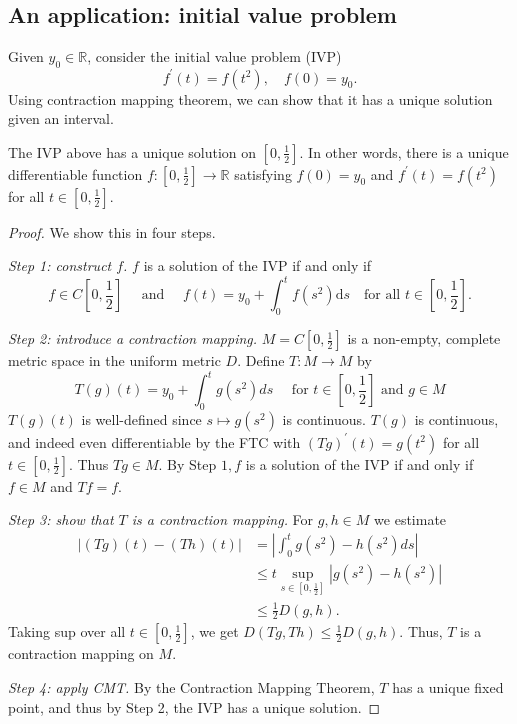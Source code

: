 \documentclass[a4paper,11pt]{article}
\begin{document}
\subsection{An application: initial value problem}
Given $y_0 \in \mathbb{R}$, consider the initial value problem (IVP)
\[
f^{\prime}(t)=f\left(t^2\right), \quad f(0)=y_0.
\]
Using contraction mapping theorem, we can show that it has a unique solution given an interval. 
\begin{proposition}
    The IVP above has a unique solution on $\left[0, \frac{1}{2}\right]$. In other words, there is a unique differentiable function $f:\left[0, \frac{1}{2}\right] \rightarrow \mathbb{R}$ satisfying $f(0)=y_0$ and $f^{\prime}(t)=f\left(t^2\right)$ for all $t \in\left[0, \frac{1}{2}\right]$.
\end{proposition}
\begin{proof}
    We show this in four steps. 

    \textit{Step 1: construct $f$.} $ f$ is a solution of the IVP if and only if
        \[
        f \in C\left[0, \frac{1}{2}\right] \quad \text { and } \quad f(t)=y_0+\int_0^t f\left(s^2\right) \mathrm{d} s \quad \text {for all } t \in\left[0, \frac{1}{2}\right].
        \]

    \textit{Step 2: introduce a contraction mapping.} $ M=C\left[0, \frac{1}{2}\right]$ is a non-empty, complete metric space in the uniform metric $D$. Define $T: M \rightarrow M$ by
    \[
    T(g)(t)=y_0+\int_0^t g\left(s^2\right) d s \quad \text { for } t \in\left[0, \frac{1}{2}\right] \text { and } g \in M
    \]
    $T(g)(t)$ is well-defined since $s \mapsto g\left(s^2\right)$ is continuous. $T(g)$ is continuous, and indeed even differentiable by the FTC with $(T g)^{\prime}(t)=g\left(t^2\right)$ for all $t \in\left[0, \frac{1}{2}\right]$.
    Thus $T g \in M$.
    By Step $1, f$ is a solution of the IVP if and only if $f \in M$ and $T f=f$.

    \textit{Step 3: show that $T$ is a contraction mapping.} For $g, h \in M$ we estimate
    \begin{align*}
        |(T g)(t)-(T h)(t)|&=\left|\int_0^t g\left(s^2\right)-h\left(s^2\right) d s\right| \\ 
        &\leqslant t \sup _{s \in\left[0, \frac{1}{2}\right]}\left|g\left(s^2\right)-h\left(s^2\right)\right| \\ 
        &\leqslant \frac{1}{2} D(g, h).
    \end{align*}
    Taking sup over all $t \in\left[0, \frac{1}{2}\right]$, we get $D(T g, T h) \leqslant \frac{1}{2} D(g, h)$. Thus, $T$ is a contraction mapping on $M$.

    \textit{Step 4: apply CMT.} By the Contraction Mapping Theorem, $T$ has a unique fixed point, and thus by Step 2, the IVP has a unique solution.
\end{proof}
\end{document}
